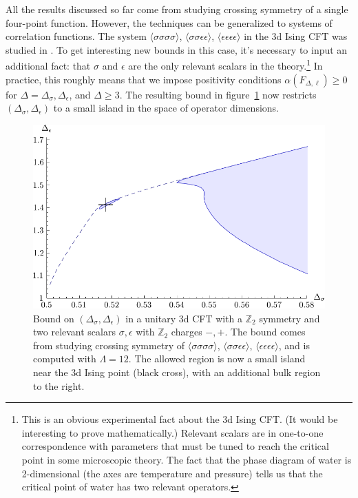 \documentclass{ws-rv9x6}
\newcommand\e\epsilon
\newcommand\<\langle
\renewcommand\>\rangle
\newcommand\Z{\mathbb{Z}}
\renewcommand\.{\cdot}
\newcommand\s\sigma
\newcommand\De{\Delta}
\begin{document}
All the results discussed so far come from studying crossing symmetry of a single four-point function.  However, the techniques can be generalized to systems of correlation functions. The system $\<\s\s\s\s\>$, $\<\s\s\e\e\>$, $\<\e\e\e\e\>$ in the 3d Ising CFT was studied in \cite{Kos:2014bka}.  To get interesting new bounds in this case, it's necessary to input an additional fact: that $\s$ and $\e$ are the only relevant scalars in the theory.\footnote{This is an obvious experimental fact about the 3d Ising CFT. (It would be interesting to prove mathematically.)  Relevant scalars are in one-to-one correspondence with parameters that must be tuned to reach the critical point in some microscopic theory.  The fact that the phase diagram of water is 2-dimensional (the axes are temperature and pressure) tells us that the critical point of water has two relevant operators.}  In practice, this roughly means that we impose positivity conditions $\alpha(F_{\De,\ell})\geq 0$ for $\De=\De_\s,\De_\e$, and $\De\geq 3$.  The resulting bound in figure~\ref{fig:multicorrelator3d} now restricts $(\De_\s,\De_\e)$ to a small island in the space of operator dimensions.

\begin{figure}[hrt!]
\begin{center}
\includegraphics[width=\textwidth]{multiCorrelator3dBound}
\end{center}
\caption{\label{fig:multicorrelator3d} Bound on $(\De_\s,\De_\e)$ in a unitary 3d CFT with a $\Z_2$ symmetry and two relevant scalars $\s,\e$ with $\Z_2$ charges $-,+$.  The bound comes from studying crossing symmetry of $\<\s\s\s\s\>$, $\<\s\s\e\e\>$, $\<\e\e\e\e\>$, and is computed with $\Lambda=12$.  The allowed region is now a small island near the 3d Ising point (black cross), with an additional bulk region to the right.}
\end{figure}
\end{document}
